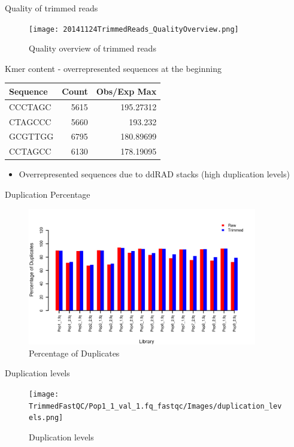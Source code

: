 \documentclass[presentation]{beamer}
\begin{document}
\begin{frame}[label=sec-15]{Quality of trimmed reads}
\begin{figure}[htb]
\centering
\texttt{[image: 20141124TrimmedReads\_QualityOverview.png]}
\caption{Quality overview of trimmed reads}
\end{figure}
\end{frame}
\begin{frame}[label=sec-16]{Kmer content - overrepresented sequences at the beginning}
\begin{center}
\begin{tabular}{lrr}
Sequence & Count & Obs/Exp Max\\
\hline
CCCTAGC & 5615 & 195.27312\\
CTAGCCC & 5660 & 193.232\\
GCGTTGG & 6795 & 180.89699\\
CCTAGCC & 6130 & 178.19095\\
\end{tabular}
\end{center}

\begin{itemize}
\item Overrepresented sequences due to ddRAD stacks (high duplication
levels)
\end{itemize}
\end{frame}

\begin{frame}[label=sec-17]{Duplication Percentage}
\begin{figure}[htb]
\centering
\includegraphics[width=10cm]{20141124PercentageDuplicates.png}
\caption{Percentage of Duplicates}
\end{figure}
\end{frame}
\begin{frame}[label=sec-18]{Duplication levels}
\begin{figure}[htb]
\centering
\texttt{[image: TrimmedFastQC/Pop1\_1\_val\_1.fq\_fastqc/Images/duplication\_levels.png]}
\caption{Duplication levels}
\end{figure}
\end{frame}
\end{document}
